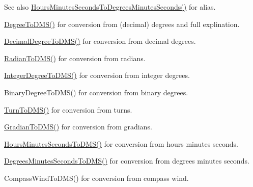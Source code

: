 \begin{DoxySeeAlso}{See also}
\mbox{\hyperlink{group___e_g_x_math-_angle_conversions-_hours_minutes_seconds_gae9eb0acc65dfe6119936f29ac292afaa}{Hours\+Minutes\+Seconds\+To\+Degrees\+Minutes\+Seconds()}} for alias. 

\mbox{\hyperlink{group___e_g_x_math-_angle_conversions-_degree_ga1096d04647918e20f61fb184ba2a7dce}{Degree\+To\+D\+M\+S()}} for conversion from (decimal) degrees and full explination. 

\mbox{\hyperlink{group___e_g_x_math-_angle_conversions-_decimal_degree_ga64a1b298ce16e9edf3209b678a7bed46}{Decimal\+Degree\+To\+D\+M\+S()}} for conversion from decimal degrees. 

\mbox{\hyperlink{group___e_g_x_math-_angle_conversions-_radian_gaf80be0c5c65ccaa5544a08a7754f3575}{Radian\+To\+D\+M\+S()}} for conversion from radians. 

\mbox{\hyperlink{group___e_g_x_math-_angle_conversions-_integer_degree_gaf76779bcc23268b41d4c3a7610d60eaf}{Integer\+Degree\+To\+D\+M\+S()}} for conversion from integer degrees. 

Binary\+Degree\+To\+D\+M\+S() for conversion from binary degrees. 

\mbox{\hyperlink{group___e_g_x_math-_angle_conversions-_turn_ga6ca011c0ae55ae079402080d7a1b4010}{Turn\+To\+D\+M\+S()}} for conversion from turns. 

\mbox{\hyperlink{group___e_g_x_math-_angle_conversions-_gradian_ga0b6700b55ab4a24fa581bf2af0dafdaa}{Gradian\+To\+D\+M\+S()}} for conversion from gradians. 

\mbox{\hyperlink{group___e_g_x_math-_angle_conversions-_hours_minutes_seconds_ga8fe72f56eebb44d7e8d7033476bbdd9b}{Hours\+Minutes\+Seconds\+To\+D\+M\+S()}} for conversion from hours minutes seconds. 

\mbox{\hyperlink{group___e_g_x_math-_angle_conversions-_degrees_minutes_seconds_gae6652ea4b358b3f35f6b7c18faffabb2}{Degrees\+Minutes\+Seconds\+To\+D\+M\+S()}} for conversion from degrees minutes seconds. 

Compass\+Wind\+To\+D\+M\+S() for conversion from compass wind. 
\end{DoxySeeAlso}
\mbox{\label{group___e_g_x_math-_angle_conversions-_hours_minutes_seconds_ga356f1e89c3ea35a9d46967644d4ddfd3}} 
